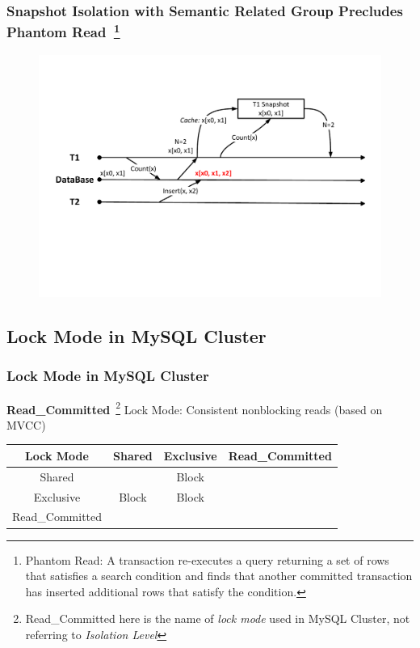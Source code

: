 \documentclass{beamer}
\begin{document}
\begin{frame}
	\frametitle{Snapshot Isolation with Semantic Related Group Precludes \textbf{Phantom Read}~\footnote{Phantom Read: A transaction re-executes a query returning a set of rows that satisfies a search condition and finds that another committed transaction has inserted additional rows that satisfy the condition.}}
\begin{figure}[!h]
	\centering
	\includegraphics[width=\linewidth]{figs/snapphantom.pdf}
\end{figure}
\end{frame}

\subsection{Lock Mode in MySQL Cluster}
\begin{frame}
	\frametitle{Lock Mode in MySQL Cluster}
	\textbf{Read\_Committed}~\footnote{Read\_Committed here is the name of \textit{lock mode} used in MySQL Cluster, not referring to \textit{Isolation Level}} Lock Mode: Consistent nonblocking reads (based on MVCC)
\begin{table}[h]
	\centering
	\begin{tabular}{|c|c|c|c|}
		\hline
		\textbf{Lock Mode} & \textbf{Shared} & \textbf{Exclusive} & \textbf{Read\_Committed} \\ \hline
		Shared             & \checkmark               & Block              & \checkmark                        \\ \hline
		Exclusive          & Block           & Block              & \checkmark                        \\ \hline
		Read\_Committed    & \checkmark               &            \checkmark        & \checkmark                        \\ \hline
	\end{tabular}
\end{table}
\end{frame}
\end{document}
